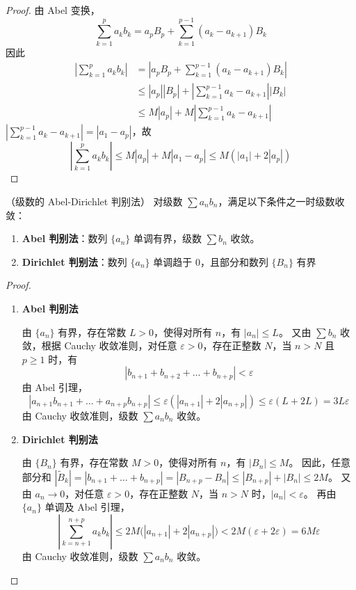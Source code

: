 \begin{proof}
	由 Abel 变换，
	\[
	\sum_{k=1}^p a_k b_k = a_p B_p + \sum_{k=1}^{p-1} (a_k - a_{k+1}) B_k
	\]
	因此
	\[
	\begin{aligned}
		\left| \sum_{k=1}^p a_k b_k \right|
		&= \left| a_p B_p + \sum_{k=1}^{p-1} (a_k - a_{k+1}) B_k \right| \\
		&\le |a_p| |B_p| + |\sum_{k=1}^{p-1} a_k - a_{k+1}| |B_k| \\
		&\le M |a_p| + M |\sum_{k=1}^{p-1} a_k - a_{k+1}|
	\end{aligned}
	\]
	$|\sum\limits_{k=1}^{p-1} a_k - a_{k+1}| = |a_1 - a_p|$，故
	\[
	\left| \sum_{k=1}^p a_k b_k \right| \le M |a_p| + M |a_1 - a_p| \le M \left( |a_1| + 2|a_p| \right)
	\]
	
\end{proof}
\begin{proposition}
	（级数的 Abel-Dirichlet 判别法）
	对级数 $\sum a_n b_n$，满足以下条件之一时级数收敛：
	
	\begin{enumerate}
		\item \textbf{Abel 判别法}：数列 $\{a_n\}$ 单调有界，级数 $\sum b_n$ 收敛。
		\item \textbf{Dirichlet 判别法}：数列 $\{a_n\}$ 单调趋于 $0$，且部分和数列 $\{B_n\}$ 有界
	\end{enumerate}
\end{proposition}
\begin{proof}
	\begin{enumerate}
		\item \textbf{Abel 判别法}
		
		由 $\{a_n\}$ 有界，存在常数 $L > 0$，使得对所有 $n$，有 $|a_n| \le L$。
		又由 $\sum b_n$ 收敛，根据 Cauchy 收敛准则，对任意 $\varepsilon > 0$，存在正整数 $N$，当 $n > N$ 且 $p \ge 1$ 时，有
		\[
		|b_{n+1} + b_{n+2} + \dots + b_{n+p}| < \varepsilon
		\]
		由 Abel 引理，
		\[
		|a_{n+1}b_{n+1} + \dots + a_{n+p}b_{n+p}| \le \varepsilon(|a_{n+1}| + 2|a_{n+p}|) \le \varepsilon(L + 2L) = 3L\varepsilon
		\]
		由 Cauchy 收敛准则，级数 $\sum a_n b_n$ 收敛。
		
		\item \textbf{Dirichlet 判别法}
		
		由 $\{B_n\}$ 有界，存在常数 $M > 0$，使得对所有 $n$，有 $|B_n| \le M$。
		因此，任意部分和 $|\widetilde{B}_k| = |b_{n+1} + \dots + b_{n+p}| = |B_{n+p} - B_n| \le |B_{n+p}| + |B_n| \le 2M$。
		又由 $a_n \to 0$，对任意 $\varepsilon > 0$，存在正整数 $N$，当 $n > N$ 时，$|a_n| < \varepsilon$。
		再由 $\{a_n\}$ 单调及 Abel 引理，
		\[
		\left| \sum_{k=n+1}^{n+p} a_k b_k \right| \le 2M \big( |a_{n+1}| + 2|a_{n+p}| \big) < 2M(\varepsilon + 2\varepsilon) = 6M\varepsilon
		\]
		由 Cauchy 收敛准则，级数 $\sum a_n b_n$ 收敛。
	\end{enumerate}
	
\end{proof}
